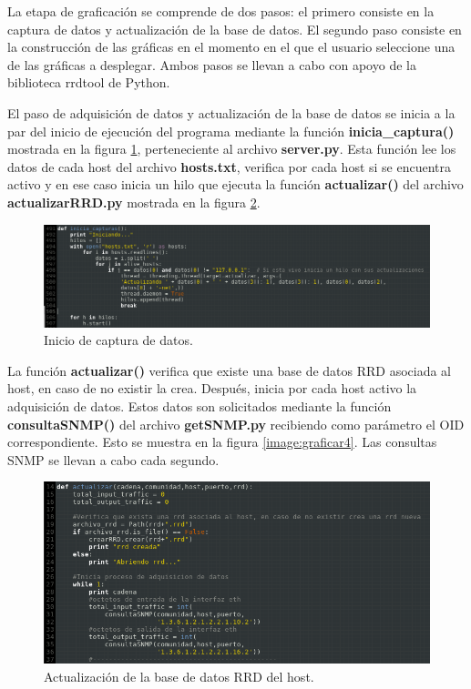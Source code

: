 La etapa de graficación se comprende de dos pasos: el primero consiste en la captura de datos y actualización de la base de datos. El segundo paso consiste en la construcción de las gráficas en el momento en el que el usuario seleccione una de las gráficas a desplegar. Ambos pasos se llevan a cabo con apoyo de la biblioteca rrdtool de Python.

El paso de adquisición de datos y actualización de la base de datos se inicia a la par del inicio de ejecución del programa mediante la función \textbf{inicia\_captura()} mostrada en la figura \ref{image:graficar1}, perteneciente al archivo \textbf{server.py}. Esta función lee los datos de cada host del archivo \textbf{hosts.txt}, verifica por cada host si se encuentra activo y en ese caso inicia un hilo que ejecuta la función \textbf{actualizar()} del archivo \textbf{actualizarRRD.py} mostrada en la figura \ref{image:graficar2}.

\FloatBarrier
\begin{figure}[htbp!]
		\centering
			\includegraphics[width=.9 \textwidth]{images/graficar1}
		\caption{Inicio de captura de datos.}
		\label{image:graficar1}
\end{figure}
\FloatBarrier

La función \textbf{actualizar()} verifica que existe una base de datos RRD asociada al host, en caso de no existir la crea. Después, inicia por cada host activo la adquisición de datos. Estos datos son solicitados mediante la función \textbf{consultaSNMP()} del archivo \textbf{getSNMP.py} recibiendo como parámetro el OID correspondiente. Esto se muestra en la figura \ref{image:graficar4}. Las consultas SNMP se llevan a cabo cada segundo.

\FloatBarrier
\begin{figure}[htbp!]
		\centering
			\includegraphics[width=.9 \textwidth]{images/graficar3}
		\caption{Actualización de la base de datos RRD del host.}
		\label{image:graficar2}
\end{figure}
\FloatBarrier

